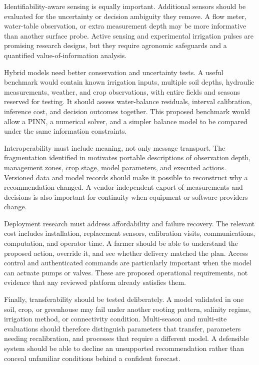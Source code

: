 \documentclass[acmsmall,screen,nonacm]{acmart}
\begin{document}
Identifiability-aware sensing is equally important. Additional sensors should be evaluated for the uncertainty or decision ambiguity they remove. A flow meter, water-table observation, or extra measurement depth may be more informative than another surface probe. Active sensing and experimental irrigation pulses are promising research designs, but they require agronomic safeguards and a quantified value-of-information analysis.

Hybrid models need better conservation and uncertainty tests. A useful benchmark would contain known irrigation inputs, multiple soil depths, hydraulic measurements, weather, and crop observations, with entire fields and seasons reserved for testing. It should assess water-balance residuals, interval calibration, inference cost, and decision outcomes together. This proposed benchmark would allow a PINN, a numerical solver, and a simpler balance model to be compared under the same information constraints.

Interoperability must include meaning, not only message transport. The fragmentation identified in \cite{R04} motivates portable descriptions of observation depth, management zones, crop stage, model parameters, and executed actions. Versioned data and model records should make it possible to reconstruct why a recommendation changed. A vendor-independent export of measurements and decisions is also important for continuity when equipment or software providers change.

Deployment research must address affordability and failure recovery. The relevant cost includes installation, replacement sensors, calibration visits, communications, computation, and operator time. A farmer should be able to understand the proposed action, override it, and see whether delivery matched the plan. Access control and authenticated commands are particularly important when the model can actuate pumps or valves. These are proposed operational requirements, not evidence that any reviewed platform already satisfies them.

Finally, transferability should be tested deliberately. A model validated in one soil, crop, or greenhouse may fail under another rooting pattern, salinity regime, irrigation method, or connectivity condition. Multi-season and multi-site evaluations should therefore distinguish parameters that transfer, parameters needing recalibration, and processes that require a different model. A defensible system should be able to decline an unsupported recommendation rather than conceal unfamiliar conditions behind a confident forecast.
\end{document}
